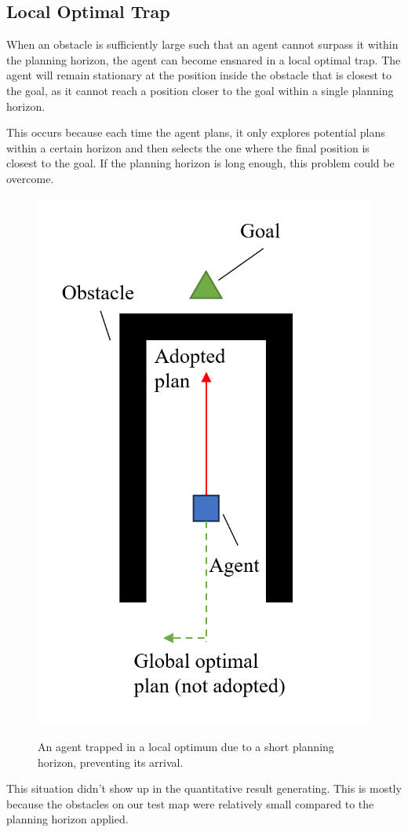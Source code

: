 \subsection{Local Optimal Trap}

When an obstacle is sufficiently large such that an agent cannot surpass it within the planning horizon, the agent can become ensnared in a local optimal trap.
The agent will remain stationary at the position inside the obstacle that is closest to the goal, as it cannot reach a position closer to the goal within a single planning horizon.

This occurs because each time the agent plans, it only explores potential plans within a certain horizon and then selects the one where the final position is closest to the goal.
If the planning horizon is long enough, this problem could be overcome.

\begin{figure}[htbp]
    \centering
    \includegraphics[width = 0.34\linewidth]{figures/Local Optimal Trap.png}
    \label{fig:LocalOptimalTrap}
    \caption{An agent trapped in a local optimum due to a short planning horizon, preventing its arrival.}%
\end{figure}

This situation didn't show up in the quantitative result generating. This is mostly because the obstacles on our test map were relatively small compared to the planning horizon applied.
